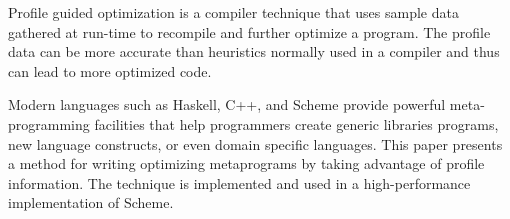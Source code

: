Profile guided optimization is a compiler technique that uses sample data
gathered at run-time to recompile and further optimize a program. The profile
data can be more accurate than heuristics normally used in a compiler and thus
can lead to more optimized code. 

Modern languages such as Haskell, C++, and Scheme provide powerful
meta-programming facilities that help programmers create generic
libraries programs, new language constructs, or even domain specific
languages. This paper presents a method for writing optimizing
metaprograms by taking advantage of profile information. The technique
is implemented and used in a high-performance implementation of Scheme.
